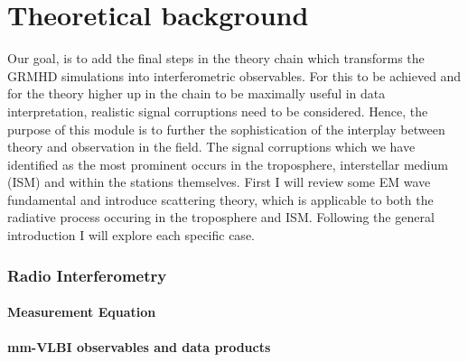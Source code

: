 \chapter{Theoretical background}
Our goal, is to add the final steps in the theory chain which transforms the GRMHD simulations into interferometric observables. For this to be achieved and for the theory higher up in the chain to be maximally useful in data interpretation, realistic signal corruptions need to be considered. Hence, the purpose of this module is to further the sophistication of the interplay between theory and observation in the field.
The signal corruptions which we have identified as the most prominent occurs in the troposphere, interstellar medium (ISM) and within the stations themselves. First I will review some EM wave fundamental and introduce scattering theory, which is applicable to both the radiative process occuring in the troposphere and ISM. Following the general introduction I will explore each specific case.

\subsection{Radio Interferometry}





\subsubsection{Measurement Equation}



\subsubsection{mm-VLBI observables and data products}

